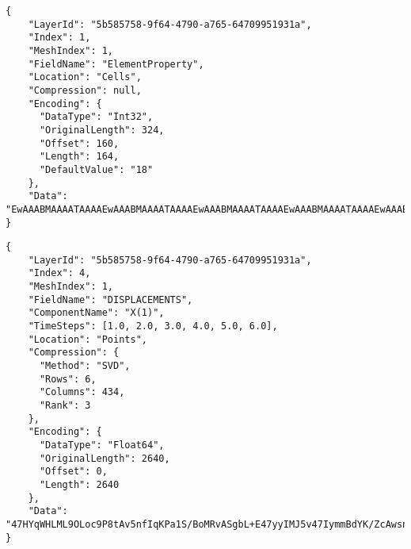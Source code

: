 \begin{lstlisting}[style=json,caption=Example of attribute.json document,label=lst:attribute.json]
{
    "LayerId": "5b585758-9f64-4790-a765-64709951931a",
    "Index": 1,
    "MeshIndex": 1,
    "FieldName": "ElementProperty",
    "Location": "Cells",
    "Compression": null,
    "Encoding": {
      "DataType": "Int32",
      "OriginalLength": 324,
      "Offset": 160,
      "Length": 164,
      "DefaultValue": "18"
    },
    "Data": "EwAAABMAAAATAAAAEwAAABMAAAATAAAAEwAAABMAAAATAAAAEwAAABMAAAATAAAAEwAAABMAAAATAAAAEwAAAB..."
}
\end{lstlisting}

\begin{lstlisting}[style=json,caption=Example of result.json document,label=lst:result.json]
{
    "LayerId": "5b585758-9f64-4790-a765-64709951931a",
    "Index": 4,
    "MeshIndex": 1,
    "FieldName": "DISPLACEMENTS",
    "ComponentName": "X(1)",
    "TimeSteps": [1.0, 2.0, 3.0, 4.0, 5.0, 6.0],
    "Location": "Points",
    "Compression": {
      "Method": "SVD",
      "Rows": 6,
      "Columns": 434,
      "Rank": 3
    },
    "Encoding": {
      "DataType": "Float64",
      "OriginalLength": 2640,
      "Offset": 0,
      "Length": 2640
    },
    "Data": "47HYqWHLML9OLoc9P8tAv5nfIqKPa1S/BoMRvASgbL+E47yyIMJ5v47IymmBdYK/ZcAwsn55IL+uuEUHN3swv1..."
}
\end{lstlisting}